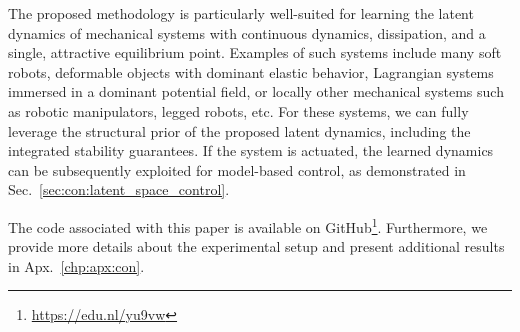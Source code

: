 The proposed methodology is particularly well-suited for learning the latent dynamics of mechanical systems with continuous dynamics, dissipation, and a single, attractive equilibrium point. Examples of such systems include many soft robots, deformable objects with dominant elastic behavior, Lagrangian systems immersed in a dominant potential field, or locally other mechanical systems such as robotic manipulators, legged robots, etc. For these systems, we can fully leverage the structural prior of the proposed latent dynamics, including the integrated stability guarantees. If the system is actuated, the learned dynamics can be subsequently exploited for model-based control, as demonstrated in Sec.~\ref{sec:con:latent_space_control}.

The code associated with this paper is available on GitHub\footnote{\url{https://edu.nl/yu9vw}}.
Furthermore, we provide more details about the experimental setup and present additional results in Apx.~\ref{chp:apx:con}.

